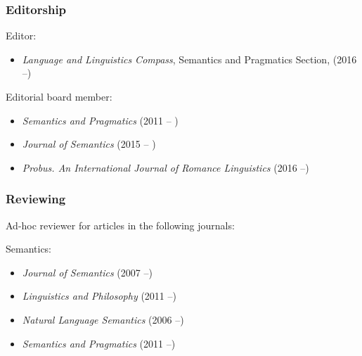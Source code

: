 \documentclass[11pt]{article}
\begin{document}
\subsubsection*{Editorship}

Editor:

\begin{itemize}

\item[] \textit{Language and Linguistics Compass}, Semantics and Pragmatics Section, (2016 --)

\end{itemize}

Editorial board member: 

\begin{itemize}
  \item[] \textit{Semantics and Pragmatics} (2011 -- )
  \item[] \textit{Journal of Semantics} (2015 -- )
  \item[] \textit{Probus. An International Journal of Romance Linguistics} (2016 --)
\end{itemize}

\vspace{-10pt}

\subsubsection*{Reviewing}

Ad-hoc reviewer for articles in the following journals:

Semantics: 

\begin{itemize}
\item[] \textit{Journal of Semantics} (2007 --)
\item[] \textit{Linguistics and Philosophy} (2011 --)
\item[]\textit{Natural Language Semantics} (2006 --) 
\item[] \textit{Semantics and Pragmatics} (2011 --)
\end{itemize}
\end{document}
